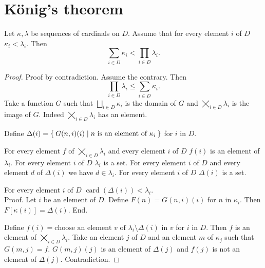 \documentclass{article}
\newcommand{\card}[1]{\operatorname{card}(#1)}
\newcommand{\SumSet}[2]{\bigsqcup_{i \in #2} #1_{i}}
\newcommand{\Sum}[2]{\sum_{i \in #2} #1_{i}}
\newcommand{\ProdSet}[2]{\bigtimes_{i \in #2} #1_{i}}
\newcommand{\Prod}[2]{\prod_{i \in #2} #1_{i}}
\begin{document}
\section{König's theorem}

\begin{forthel}
  \begin{theorem}
    Let $\kappa, \lambda$ be sequences of cardinals on $D$.
    Assume that for every element $i$ of $D$ $\kappa_{i} < \lambda_{i}$.
    Then \[ \Sum{\kappa}{D} < \Prod{\lambda}{D}. \]
  \end{theorem}
  \begin{proof}
    Proof by contradiction.
    Assume the contrary.
    Then \[ \Prod{\lambda}{D} \leq \Sum{\kappa}{D}. \]
    Take a function $G$ such that $\SumSet{\kappa}{D}$ is the domain of $G$ and
    $\ProdSet{\lambda}{D}$ is the image of $G$.
    Indeed $\ProdSet{\lambda}{D}$ has an element.

    Define $\Delta(i) = \Set{G(n,i)(i) | \text{$n$ is an element of
    $\kappa_{i}$}}$ for $i$ in $D$.

    For every element $f$ of $\ProdSet{\lambda}{D}$ and every element $i$ of $D$
    $f(i)$ is an element of $\lambda_{i}$.
    For every element $i$ of $D$ $\lambda_{i}$ is a set.
    For every element $i$ of $D$ and every element $d$ of $\Delta(i)$ we have
    $d\in \lambda_{i}$.
    For every element $i$ of $D$ $\Delta(i)$ is a set.

    For every element $i$ of $D$ $\card{\Delta(i)} < \lambda_{i}$. \\
    Proof.
      Let $i$ be an element of $D$.
      Define $F(n) = G(n,i)(i)$ for $n$ in $\kappa_{i}$.
      Then $F[\kappa(i)] = \Delta(i)$.
    End.

    Define $f(i) = \text{choose an element $v$ of $\lambda_{i} \setminus
    \Delta(i)$ in $v$}$ for $i$ in $D$.
    Then $f$ is an element of $\ProdSet{\lambda}{D}$.
    Take an element $j$ of $D$ and an element $m$ of $\kappa_{j}$ such that
    $G(m,j) = f$.
    $G(m,j)(j)$ is an element of $\Delta(j)$ and $f(j)$ is not an element of
    $\Delta(j)$.
    Contradiction.
  \end{proof}
\end{forthel}
\end{document}
